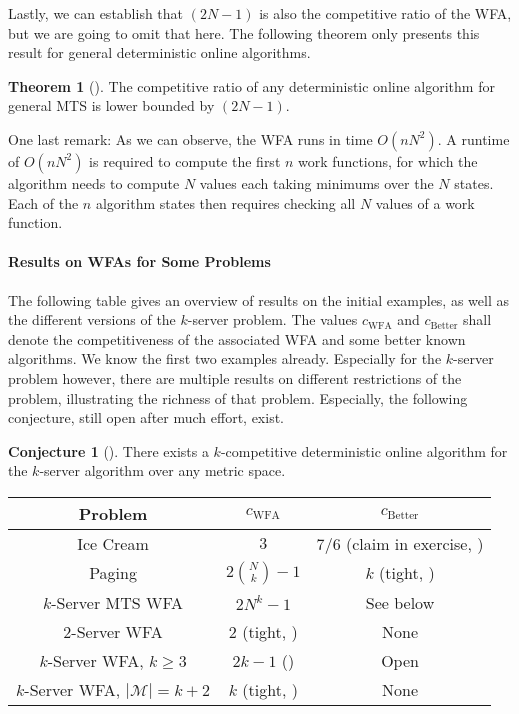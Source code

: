 \documentclass[10pt]{amsart}
\theoremstyle{definition}
\newtheorem{theorem}{Theorem}
\newtheorem{conjecture}{Conjecture}
\theoremstyle{remark}
\begin{document}
    Lastly, we can establish that \((2N-1)\) is also the competitive ratio of the WFA, but we are going to omit that here. The following theorem only presents this result for general deterministic online algorithms.

    \begin{theorem}[{\cite[pp. 128-132]{Borodin}}]
        The competitive ratio of any deterministic online algorithm for general MTS is lower bounded by \((2N-1)\).
    \end{theorem}

    One last remark: As we can observe, the WFA runs in time \(O(n N^2)\). A runtime of \(O(n N^2)\) is required to compute the first \(n\) work functions, for which the algorithm needs to compute \(N\) values each taking minimums over the \(N\) states. Each of the \(n\) algorithm states then requires checking all \(N\) values of a work function.

    \phantom{}

    \paragraph{\textbf{Results on WFAs for Some Problems}}

    The following table gives an overview of results on the initial examples, as well as the different versions of the \(k\)-server problem. The values \(c_{\text{WFA}}\) and \(c_{\text{Better}}\) shall denote the competitiveness of the associated WFA and some better known algorithms. We know the first two examples already. Especially for the \(k\)-server problem however, there are multiple results on different restrictions of the problem, illustrating the richness of that problem. Especially, the following conjecture, still open after much effort, exist.

    \begin{conjecture}[{\cite[pp. 152-153]{Borodin}}]
        There exists a \(k\)-competitive deterministic online algorithm for the \(k\)-server algorithm over any metric space.
    \end{conjecture}

    \begin{table}[!hbtp]
        \begin{tabular}{c|c|c}
            Problem & \(c_{\text{WFA}}\) & \(c_{\text{Better}}\)\\\hline
            Ice Cream & \(3\) & \(7/6\) (claim in exercise, \cite[pp. 80-82]{Woeginger}) \\
            Paging & \(2\binom{N}{k}-1\) & \(k\) (tight, \cite[pp. 54-56]{Woeginger})\\
            \(k\)-Server MTS WFA & \(2N^k-1\) & See below\\
            \(2\)-Server WFA & \(2\) (tight, \cite[pp. 87-89, p. 94]{Woeginger}) & None\\
            \(k\)-Server WFA, \(k \geq 3\) & \(2k-1\) (\cite[pp. 92-93]{Woeginger}) & Open\\
            \(k\)-Server WFA, \(|\mathcal{M}| = k+2\) & \(k\) (tight, \cite[pp. 87-89, pp. 94-95]{Woeginger}) & None
        \end{tabular}
    \end{table}
\end{document}
